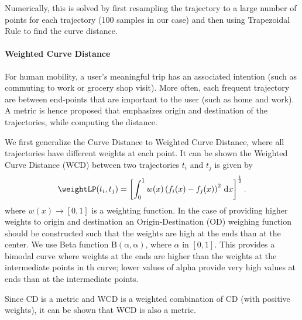 Numerically, this is solved by first resampling the trajectory to a large number of points for each trajectory (100 samples in our case) and then using Trapezoidal Rule to find the curve distance. %

\paragraph{Weighted Curve Distance} For human mobility, a user's meaningful trip has an associated intention (such as commuting to work or grocery shop visit). More often, each frequent trajectory are between end-points that are important to the user (such as home and work). A metric is hence proposed that emphasizes origin and destination of the trajectories, while computing the distance. 

We first generalize the Curve Distance to Weighted Curve Distance, where all trajectories have different weights at each point.  It can be shown the Weighted Curve Distance (WCD) between two trajectories $t_i$ and $t_j$ is given by
\begin{align}
\weightLP(t_i,t_j) = \left[ \int_{0}^{1}{ w(x) \left( f_i(x) - f_j(x) \right )^2\, \mathrm{d}x }\right] ^ {\frac{1}{2}}.
\end{align}
\noindent where $w(x) \rightarrow [0,1]$ is a weighting function. In the case of providing higher weights to origin and destination an Origin-Destination (OD) weighing function should be constructed such that the weights are high at the ends than at the center. We use Beta function $\operatorname{B(\alpha,\alpha)}$, where $\alpha$ in $[0,1]$. This provides a bimodal curve where weights at the ends are higher than the weights at the intermediate points in th curve; lower values of alpha provide very high values at ends than at the intermediate points.

Since CD is a metric and WCD is a weighted combination of CD (with positive weights), it can be shown that WCD is also a metric.%


